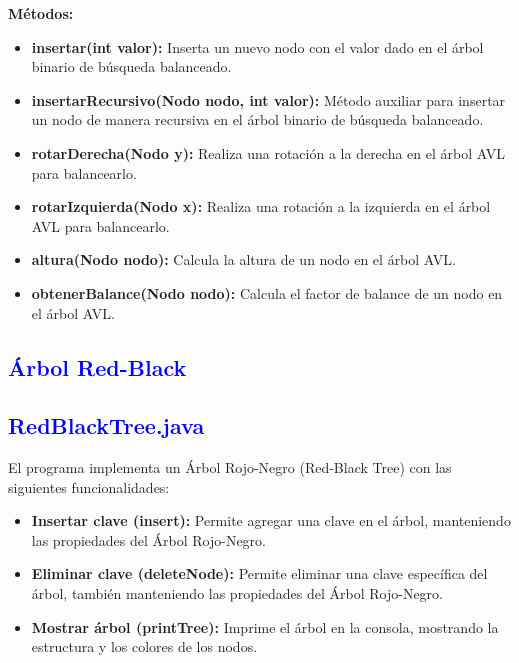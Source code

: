\documentclass[12pt]{article}
\begin{document}
\textbf{Métodos:}
\begin{itemize}
    \item \textbf{insertar(int valor):} Inserta un nuevo nodo con el valor dado en el árbol binario de búsqueda balanceado.
    
    \item \textbf{insertarRecursivo(Nodo nodo, int valor):} Método auxiliar para insertar un nodo de manera recursiva en el árbol binario de búsqueda balanceado.

    \item \textbf{rotarDerecha(Nodo y):} Realiza una rotación a la derecha en el árbol AVL para balancearlo.

    \item \textbf{rotarIzquierda(Nodo x):} Realiza una rotación a la izquierda en el árbol AVL para balancearlo.

    \item \textbf{altura(Nodo nodo):} Calcula la altura de un nodo en el árbol AVL.

    \item \textbf{obtenerBalance(Nodo nodo):} Calcula el factor de balance de un nodo en el árbol AVL.
\end{itemize}

\subsection*{\textcolor{blue}{Árbol Red-Black}}
\subsection{\textcolor{blue}{RedBlackTree.java}}
El programa implementa un Árbol Rojo-Negro (Red-Black Tree) con las siguientes funcionalidades:
\begin{itemize}
    \item \textbf{Insertar clave (insert):} Permite agregar una clave en el árbol, manteniendo las propiedades del Árbol Rojo-Negro.
    \item \textbf{Eliminar clave (deleteNode):} Permite eliminar una clave específica del árbol, también manteniendo las propiedades del Árbol Rojo-Negro.
    \item \textbf{Mostrar árbol (printTree):} Imprime el árbol en la consola, mostrando la estructura y los colores de los nodos.
\end{itemize}
\end{document}
